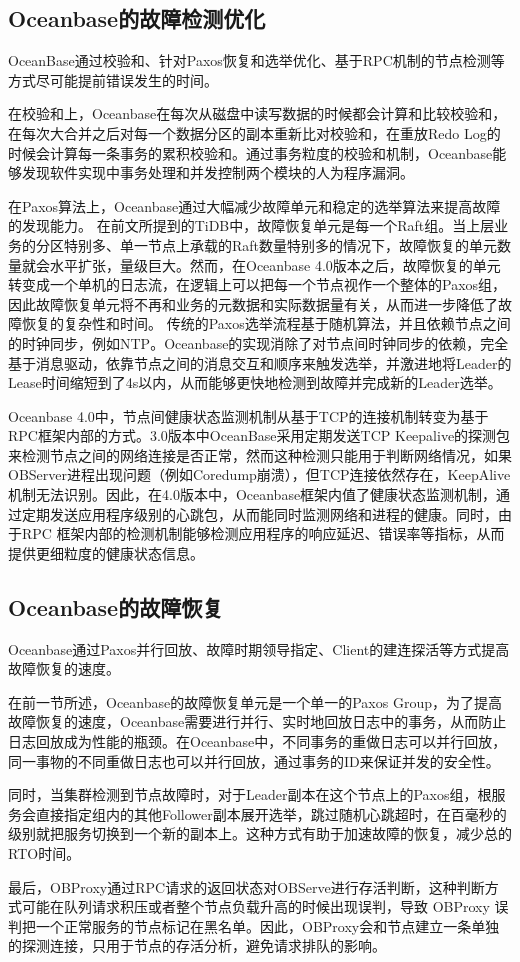 \subsection{Oceanbase的故障检测优化}

OceanBase通过校验和、针对Paxos恢复和选举优化、基于RPC机制的节点检测等方式尽可能提前错误发生的时间。

在校验和上，Oceanbase在每次从磁盘中读写数据的时候都会计算和比较校验和，在每次大合并之后对每一个数据分区的副本重新比对校验和，在重放Redo Log的时候会计算每一条事务的累积校验和。通过事务粒度的校验和机制，Oceanbase能够发现软件实现中事务处理和并发控制两个模块的人为程序漏洞。

在Paxos算法上，Oceanbase通过大幅减少故障单元和稳定的选举算法来提高故障的发现能力。
在前文所提到的TiDB中，故障恢复单元是每一个Raft组。当上层业务的分区特别多、单一节点上承载的Raft数量特别多的情况下，故障恢复的单元数量就会水平扩张，量级巨大。然而，在Oceanbase 4.0版本之后，故障恢复的单元转变成一个单机的日志流，在逻辑上可以把每一个节点视作一个整体的Paxos组，因此故障恢复单元将不再和业务的元数据和实际数据量有关，从而进一步降低了故障恢复的复杂性和时间。
传统的Paxos选举流程基于随机算法，并且依赖节点之间的时钟同步，例如NTP。Oceanbase的实现消除了对节点间时钟同步的依赖，完全基于消息驱动，依靠节点之间的消息交互和顺序来触发选举，并激进地将Leader的Lease时间缩短到了4s以内，从而能够更快地检测到故障并完成新的Leader选举。

Oceanbase 4.0中，节点间健康状态监测机制从基于TCP的连接机制转变为基于RPC框架内部的方式。3.0版本中OceanBase采用定期发送TCP Keepalive的探测包来检测节点之间的网络连接是否正常，然而这种检测只能用于判断网络情况，如果OBServer进程出现问题（例如Coredump崩溃），但TCP连接依然存在，KeepAlive机制无法识别。因此，在4.0版本中，Oceanbase框架内值了健康状态监测机制，通过定期发送应用程序级别的心跳包，从而能同时监测网络和进程的健康。同时，由于RPC 框架内部的检测机制能够检测应用程序的响应延迟、错误率等指标，从而提供更细粒度的健康状态信息。

\subsection{Oceanbase的故障恢复}

Oceanbase通过Paxos并行回放、故障时期领导指定、Client的建连探活等方式提高故障恢复的速度。

在前一节所述，Oceanbase的故障恢复单元是一个单一的Paxos Group，为了提高故障恢复的速度，Oceanbase需要进行并行、实时地回放日志中的事务，从而防止日志回放成为性能的瓶颈。在Oceanbase中，不同事务的重做日志可以并行回放，同一事物的不同重做日志也可以并行回放，通过事务的ID来保证并发的安全性。

同时，当集群检测到节点故障时，对于Leader副本在这个节点上的Paxos组，根服务会直接指定组内的其他Follower副本展开选举，跳过随机心跳超时，在百毫秒的级别就把服务切换到一个新的副本上。这种方式有助于加速故障的恢复，减少总的RTO时间。

最后，OBProxy通过RPC请求的返回状态对OBServe进行存活判断，这种判断方式可能在队列请求积压或者整个节点负载升高的时候出现误判，导致 OBProxy 误判把一个正常服务的节点标记在黑名单。因此，OBProxy会和节点建立一条单独的探测连接，只用于节点的存活分析，避免请求排队的影响。
